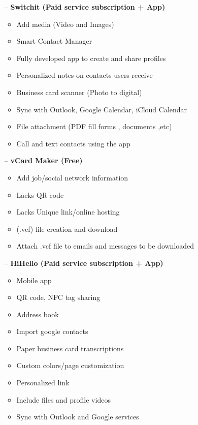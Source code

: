 \documentclass[12pt]{article}%
\begin{document}
\begin{enumerate}
\begin{enumerate}
\begin{enumerate}
                \item [--] \textbf{Switchit (Paid service subscription + App)}

                \begin{itemize}
                    \item Add media (Video and Images)
                    \item Smart Contact Manager
                    \item Fully developed app to create and share profiles
                    \item Personalized notes on contacts users receive
                    \item Business card scanner (Photo to digital)
                    \item Sync with Outlook, Google Calendar, iCloud Calendar
                    \item File attachment (PDF fill forms , documents ,etc)
                    \item Call and text contacts using the app
                \end{itemize}

                \item [--] \textbf{vCard Maker (Free)}
                \begin{itemize}
                    \item Add job/social network information
                    \item Lacks QR code
                    \item Lacks Unique link/online hosting
                    \item (.vcf) file creation and download
                    \item Attach .vcf file to emails and messages to be downloaded
                \end{itemize}

                \item [--] \textbf{HiHello (Paid service subscription + App)}

                \begin{itemize}
                    \item Mobile app
                    \item QR code, NFC tag sharing
                    \item Address book
                    \item Import google contacts
                    \item Paper business card transcriptions
                    \item Custom colors/page customization
                    \item Personalized link
                    \item Include files and profile videos
                    \item Sync with Outlook and Google services
                \end{itemize}
            \end{enumerate}


\end{enumerate}
\end{enumerate}
\end{document}

